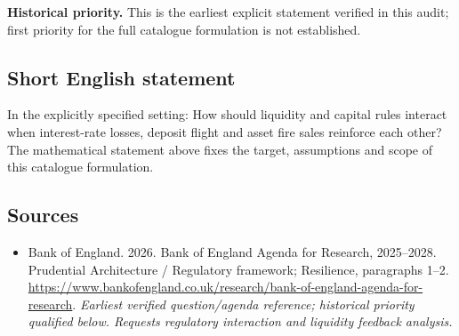 \documentclass[11pt]{article}
\begin{document}
\par\textbf{Historical priority.} This is the earliest explicit statement verified in this audit; first priority for the full catalogue formulation is not established.

\subsection{Short English statement}
In the explicitly specified setting: How should liquidity and capital rules interact when interest-rate losses, deposit flight and asset fire sales reinforce each other? The mathematical statement above fixes the target, assumptions and scope of this catalogue formulation.

\subsection{Sources}
\begin{itemize}\raggedright
\item[\textnormal{[S1]}]\hypertarget{source:30007603:1}{} Bank of England. 2026. Bank of England Agenda for Research, 2025–2028. Prudential Architecture / Regulatory framework; Resilience, paragraphs 1–2.
\url{https://www.bankofengland.co.uk/research/bank-of-england-agenda-for-research}.
{\small\textit{Earliest verified question/agenda reference; historical priority qualified below. Requests regulatory interaction and liquidity feedback analysis.}}
\end{itemize}
\end{document}
